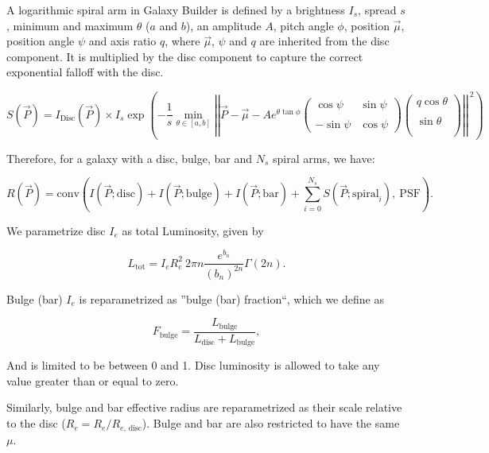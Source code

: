 \documentclass[../main.tex]{subfiles}
\begin{document}
A logarithmic spiral arm in Galaxy Builder is defined by a brightness $I_s$, spread $s$, minimum and maximum $\theta$ ($a$ and $b$), an amplitude $A$, pitch angle $\phi$, position $\vec\mu$, position angle $\psi$ and axis ratio $q$, where $\vec\mu$, $\psi$ and $q$ are inherited from the disc component. It is multiplied by the disc component to capture the correct exponential falloff with the disc.

$$S(\vec{P}) = I_\mathrm{Disc}(\vec{P}) \times I_s\exp\left(-\frac{1}{s}\min_{\theta\in[a, b]}\left|\left|\vec{P} - \vec\mu - Ae^{\theta\tan\phi}\begin{pmatrix}
\cos\psi & \sin\psi\\\\
-\sin\psi & \cos\psi
\end{pmatrix}
\begin{pmatrix}
q\cos\theta \\\\
\sin\theta \\\\
\end{pmatrix}
\right|\right|^{\ 2}\right)$$


Therefore, for a galaxy with a disc, bulge, bar and $N_s$ spiral arms, we have:

$$R(\vec{P}) = \mathrm{conv}\left(I(\vec{P}; \mathrm{disc}) + I(\vec{P}; \mathrm{bulge}) + I(\vec{P}; \mathrm{bar}) + \sum_{i=0}^{N_s} S(\vec{P}; \mathrm{spiral}_i),\ \mathrm{PSF}\right).$$

We parametrize disc $I_e$ as total Luminosity, given by

$$L_\mathrm{tot} = I_eR_e^2\ 2\pi n\frac{e^{b_n}}{(b_n)^{2n}}\Gamma(2n).$$

Bulge (bar) $I_e$ is reparametrized as ''bulge (bar) fraction``, which we define as

$$F_\mathrm{bulge} = \frac{L_\mathrm{bulge}}{L_\mathrm{disc} + L_\mathrm{bulge}},$$

And is limited to be between 0 and 1. Disc luminosity is allowed to take any value greater than or equal to zero.

Similarly, bulge and bar effective radius are reparametrized as their scale relative to the disc ($R_e = R_e / R_{e,\,\mathrm{disc}}$). Bulge and bar are also restricted to have the same $\mu$.
\end{document}
